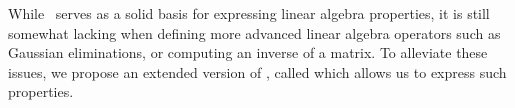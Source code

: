 


While \lang\ serves as a solid basis for expressing linear algebra properties, it is still somewhat lacking when defining more advanced linear algebra operators such as Gaussian eliminations, or computing an inverse of a matrix. To alleviate these issues, we propose an extended version of \lang, called \langfor which allows us to express such properties.





